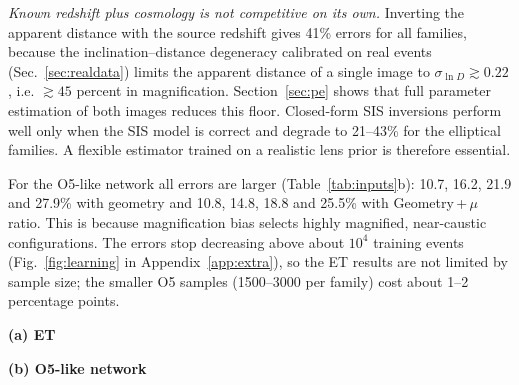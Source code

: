 \emph{Known redshift plus cosmology is not competitive on its own.} Inverting the apparent distance with the source redshift gives 41\% errors for all families, because the inclination--distance degeneracy calibrated on real events (Sec.~\ref{sec:realdata}) limits the apparent distance of a single image to $\sigma_{\ln D}\gtrsim0.22$, i.e. $\gtrsim45$ percent in magnification. Section~\ref{sec:pe} shows that full parameter estimation of both images reduces this floor. Closed-form SIS inversions perform well only when the SIS model is correct and degrade to 21--43\% for the elliptical families. A flexible estimator trained on a realistic lens prior is therefore essential.

For the O5-like network all errors are larger (Table~\ref{tab:inputs}b): 10.7, 16.2, 21.9 and 27.9\% with geometry and 10.8, 14.8, 18.8 and 25.5\% with Geometry\,+\,$\mu$ ratio. This is because magnification bias selects highly magnified, near-caustic configurations. The errors stop decreasing above about $10^4$ training events (Fig.~\ref{fig:learning} in Appendix~\ref{app:extra}), so the ET results are not limited by sample size; the smaller O5 samples (1500--3000 per family) cost about 1--2 percentage points.

\begin{table}
\centering\papertablestyle
\caption{Median relative error $|\hat\mu_A-\mu_A|/\mu_A$ (percent) of the magnification of image $A$ (larger measured SNR). Parentheses: empirical coverage of the conformal 90\% intervals (binomial standard error per division 0.003 for ET and 0.01--0.02 for O5). Top: closed-form estimators. Middle: HistGB trained and tested on the same family, means over five random divisions into training, calibration and test events (standard deviation between divisions below 0.3 percentage points for ET and 1.5 for O5). Bottom: one NPE trained on all four families, with intervals calibrated per true family, which is not possible for real lenses (see Table~\ref{tab:calibration}). Prior only: percentiles of the simulated population, ignoring the event data. $^\dagger$Scale-free combinations (Table~\ref{tab:inputsets}).}
\label{tab:inputs}
\textbf{(a) ET}\par\smallskip

\par\bigskip\textbf{(b) O5-like network}\par\smallskip

\end{table}

\begin{table}
\centering\papertablestyle
\caption{Response of the predicted magnification to an external mass sheet ($\lambda=1-\kappa_{\rm ext}$; the truth scales as ${\rm d}\ln\mu/{\rm d}\ln\lambda=-2$) and to a distance scale $1/h$ at fixed redshift (the truth is unchanged). Slopes from $\pm10$ percent transformations of the fixed test systems.}
\label{tab:response}

\end{table}

